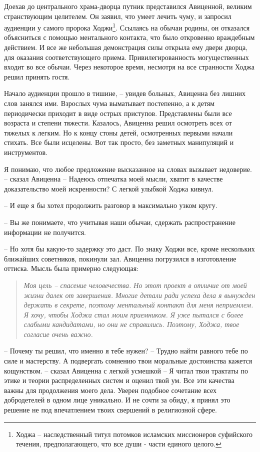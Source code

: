 \documentclass[12pt,a4paper]{article}
\begin{document}
Доехав до центрального храма-дворца путник представился Авиценной, великим странствующим целителем. Он заявил, что умеет лечить чуму, и запросил аудиенции у самого пророка Ходжи\footnote{Ходжа -- наследственный титул потомков исламских миссионеров суфийского течения, предполагающего, что все души - части единого целого.}. Ссылаясь на обычаи родины, он отказался объясниться с помощью ментального контакта, что было откровенно враждебным действием. И все же небольшая демонстрация силы открыла ему двери дворца, для оказания соответствующего приема. Привилегированность могущественных входит во все обычаи. Через некоторое время, несмотря на все странности Ходжа решил принять гостя.

Начало аудиенции прошло в тишине, -- увидев больных, Авиценна без лишних слов занялся ими. Взрослых чума выматывает постепенно, а к детям периодически приходит в виде острых приступов. Представлены были все возраста и степени тяжести. Казалось, Авиценна решил осмотреть всех от тяжелых к легким. Но к концу стоны детей, осмотренных первыми начали стихать. Все были исцелены. Вот так просто, без заметных манипуляций и инструментов.

Я понимаю, что любое предложение высказанное на словах вызывает недоверие. -- сказал Авиценна -- Надеюсь отпечатка моей мысли, хватит в качестве доказательство моей искренности?
С легкой улыбкой Ходжа кивнул.

-- И еще я бы хотел продолжить разговор в максимально узком кругу.

-- Вы же понимаете, что учитывая наши обычаи, сдержать распространение информации не получится.

-- Но хотя бы какую-то задержку это даст.
По знаку Ходжи все, кроме нескольких ближайших советников, покинули зал. Авиценна погрузился в изготовление оттиска. Мысль была примерно следующая:

\begin{quotation}
	\textit{Моя цель -- спасение человечества. Но этот проект в отличие от моей жизни далек от завершения. Многие детали ради успеха дела я вынужден держать в секрете, поэтому ментальный контакт для меня неприемлем. Я хочу, чтобы Ходжа стал моим приемником. Я уже пытался с более слабыми кандидатами, но они не справились. Поэтому, Ходжа, твое согласие очень важно.}
\end{quotation}

-- Почему ты решил, что именно я тебе нужен?
-- Трудно найти равного тебе по силе и мастерству. А подвергать сомнению твои моральные достоинства кажется кощунством. -- сказал Авиценна с легкой усмешкой -- Я читал твои трактаты по этике и теории распределенных систем и оценил твой ум. Все эти качества важны для продолжения моего дела. Уверен подобное сочетание всех добродетелей в одном лице уникально. И не сочти за обиду, я принял это решение не под впечатлением твоих свершений в религиозной сфере.
\end{document}
